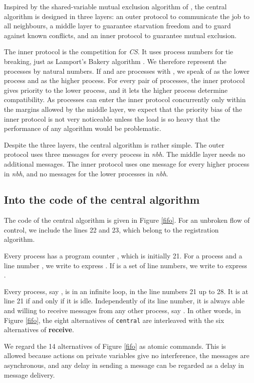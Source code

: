 \documentclass[10pt]{article} \usepackage[english]{babel}
\def\S #1/{\mbox {\textsl{#1}}}
\def\B #1/{\mbox {\textbf{#1}}}
\def\T #1/{\mbox {\texttt{#1}}}
\begin{document}
Inspired by the shared-variable mutual exclusion algorithm of
\cite{LyH91}, the central algorithm is designed in three layers: an
outer protocol to communicate the job to all neighbours, a middle
layer to guarantee starvation freedom and to guard against known
conflicts, and an inner protocol to guarantee mutual exclusion.

The inner protocol is the competition for \S CS/.  It uses process
numbers for tie breaking, just as Lamport's Bakery algorithm
\cite{Lam74}. We therefore represent the processes by natural
numbers. If  and  are processes with , we speak of  as
the lower process and  as the higher process.  For every pair of
processes, the inner protocol gives priority to the lower process, and
it lets the higher process determine compatibility.  As processes can
enter the inner protocol concurrently only within the margins allowed
by the middle layer, we expect that the priority bias of the inner
protocol is not very noticeable unless the load is so heavy that the
performance of any algorithm would be problematic.

Despite the three layers, the central algorithm is rather simple.  The
outer protocol uses three messages for every process in \S nbh/.  The
middle layer needs no additional messages.  The inner protocol uses
one message for every higher process in \S nbh/, and no messages for
the lower processes in \S nbh/.

\subsection{Into the code of the central algorithm} \label{code}

The code of the central algorithm is given in Figure \ref{fifo}.  For
an unbroken flow of control, we include the lines 22 and 23, which
belong to the registration algorithm.

Every process  has a program counter , which is
initially 21.  For a process  and a line number , we write
 to express . If  is a set of line
numbers, we write  to express .

Every process, say , is in an infinite loop, in the line numbers 21
up to 28. It is at line 21 if and only if it is idle. Independently of
its line number, it is always able and willing to receive messages
from any other process, say .  In other words, in Figure
\ref{fifo}, the eight alternatives of \T central/ are interleaved with
the six alternatives of \B receive/.

We regard the 14 alternatives of Figure \ref{fifo} as atomic commands.
This is allowed because actions on private variables give no
interference, the messages are asynchronous, and any delay in sending
a message can be regarded as a delay in message delivery.
\end{document}
